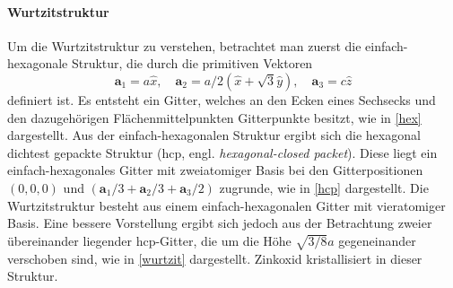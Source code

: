 \paragraph{Wurtzitstruktur}
Um die Wurtzitstruktur zu verstehen, betrachtet man zuerst die einfach-hexagonale Struktur, die durch die primitiven
Vektoren
\begin{equation*}
    \mathbf{a}_1 = a\hat{x}, \quad
    \mathbf{a}_2 = a/2 (\hat{x} + \sqrt{3} \hat{y}), \quad
    \mathbf{a}_3 = c \hat{z}
\end{equation*}
definiert ist.
Es entsteht ein Gitter, welches an den Ecken eines Sechsecks und den dazugehörigen Flächenmittelpunkten Gitterpunkte
besitzt, wie in \cref{hex} dargestellt.
Aus der einfach-hexagonalen Struktur ergibt sich die hexagonal dichtest gepackte Struktur
(hcp, engl. \textit{hexagonal-closed packet}).
Diese liegt ein einfach-hexagonales Gitter mit zweiatomiger Basis bei den Gitterpositionen $(0,0,0)$ und
$(\mathbf{a}_1/3 + \mathbf{a}_2/3 + \mathbf{a}_3/2)$ zugrunde, wie in \cref{hcp} dargestellt.\autocite[97-98]{Ashcroft}
Die Wurtzitstruktur besteht aus einem einfach-hexagonalen Gitter mit vieratomiger Basis.
Eine bessere Vorstellung ergibt sich jedoch aus der Betrachtung zweier übereinander liegender hcp-Gitter, die um
die Höhe $\sqrt {3 / 8} a$ gegeneinander verschoben sind, wie in \cref{wurtzit} dargestellt.
Zinkoxid  kristallisiert in dieser Struktur.


